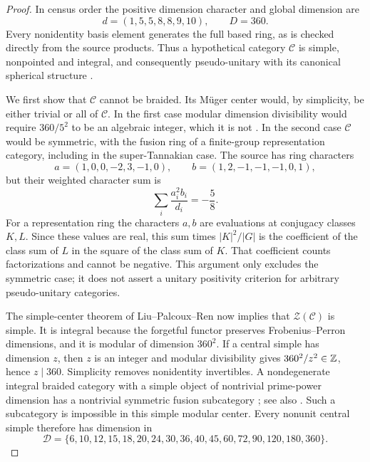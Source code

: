 \begin{proof}
In census order the positive dimension character and global dimension are
\[
d=(1,5,5,8,8,9,10),\qquad D=360.
\]
Every nonidentity basis element generates the full based ring, as is
checked directly from the source products. Thus a hypothetical category
$\mathcal C$ is simple, nonpointed and integral, and consequently
pseudo-unitary with its canonical spherical structure
\cite[Proposition~8.24]{ENO}.

We first show that $\mathcal C$ cannot be braided. Its M\"uger center
would, by simplicity, be either trivial or all of $\mathcal C$.
In the first case modular dimension divisibility would require
$360/5^2$ to be an algebraic integer, which it is not
\cite[Theorem~5.9]{LPRSimple}. In the second case $\mathcal C$ would
be symmetric, with the fusion ring of a finite-group representation
category, including in the super-Tannakian case. The source has ring
characters
\[
a=(1,0,0,-2,3,-1,0),\qquad
b=(1,2,-1,-1,-1,0,1),
\]
but their weighted character sum is
\[
\sum_i\frac{a_i^2b_i}{d_i}=-\frac58.
\]
For a representation ring the characters $a,b$ are evaluations at
conjugacy classes $K,L$. Since these values are real, this sum times
$|K|^2/|G|$ is the coefficient of the class sum of $L$ in the square
of the class sum of $K$. That coefficient counts factorizations and
cannot be negative. This argument only excludes the symmetric case;
it does not assert a unitary positivity criterion for arbitrary
pseudo-unitary categories.

The simple-center theorem of Liu--Palcoux--Ren
\cite[Theorem~5.1]{LPRSimple} now implies that
$\mathcal Z(\mathcal C)$ is simple. It is integral because the
forgetful functor preserves Frobenius--Perron dimensions, and it is
modular of dimension $360^2$. If a central simple has dimension $z$,
then $z$ is an integer and modular divisibility gives
$360^2/z^2\in\mathbb Z$, hence $z\mid360$.
Simplicity removes nonidentity invertibles. A nondegenerate integral
braided category with a simple object of nontrivial prime-power
dimension has a nontrivial symmetric fusion subcategory
\cite[Corollary~6.16]{NikshychMorita}; see also
\cite[Theorem~5.10]{LPRSimple}. Such a subcategory is impossible
in this simple modular center. Every nonunit central simple therefore
has dimension in
\begin{equation}\label{eq:r601-allowed}
\mathcal D=\{6,10,12,15,18,20,24,30,36,40,45,60,72,90,120,180,360\}.
\end{equation}


\end{proof}

